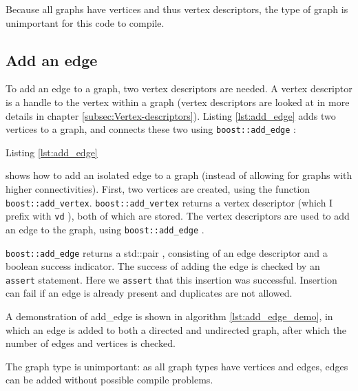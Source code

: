 Because all graphs have vertices and thus vertex descriptors, the type of
graph is unimportant for this code to compile.

\subsection{Add an edge}
\label{subsec:add_edge}

To add an edge to a graph, two vertex descriptors are needed.
A vertex descriptor 
is a handle to the vertex within a graph (vertex descriptors are looked
 at in more details in chapter 
\ref{subsec:Vertex-descriptors}).
Listing \ref{lst:add_edge}
adds two vertices to a graph, and connects these two using 
\verb;boost::add_edge; : 



Listing \ref{lst:add_edge}

shows how to add an isolated edge to a graph (instead of allowing for graphs
with higher connectivities).
First, two vertices are created, using the function \verb;boost::add_vertex;.
\verb;boost::add_vertex; returns a vertex descriptor 
(which I prefix with \verb;vd; ), 
both of which are stored.
The vertex descriptors are used to add an edge to the graph, 
using 
\verb;boost::add_edge; .

\verb;boost::add_edge; 
returns a std::pair , 
consisting of an edge descriptor and a boolean success indicator.
The success of adding the edge is checked by an \verb;assert; statement.
Here we \verb;assert; 
that this insertion was successful.
Insertion can fail if an edge is already present and duplicates are not
allowed.

A demonstration of add_edge is shown in algorithm 
\ref{lst:add_edge_demo}, 
in which an edge is added to both a directed and undirected graph, 
after which the number of edges and vertices is checked.



The graph type is unimportant: as all graph types have vertices and edges,
 edges can be added without possible compile problems.

